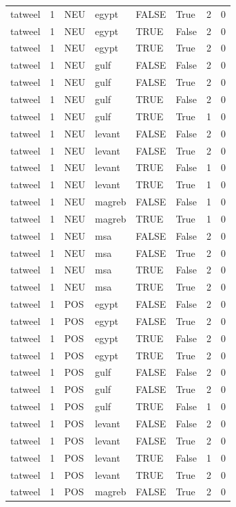 \begin{tabular}{llllllrr}
tatweel & 1 & NEU & egypt & FALSE & True & 2 & 0 \\
tatweel & 1 & NEU & egypt & TRUE & False & 2 & 0 \\
tatweel & 1 & NEU & egypt & TRUE & True & 2 & 0 \\
tatweel & 1 & NEU & gulf & FALSE & False & 2 & 0 \\
tatweel & 1 & NEU & gulf & FALSE & True & 2 & 0 \\
tatweel & 1 & NEU & gulf & TRUE & False & 2 & 0 \\
tatweel & 1 & NEU & gulf & TRUE & True & 1 & 0 \\
tatweel & 1 & NEU & levant & FALSE & False & 2 & 0 \\
tatweel & 1 & NEU & levant & FALSE & True & 2 & 0 \\
tatweel & 1 & NEU & levant & TRUE & False & 1 & 0 \\
tatweel & 1 & NEU & levant & TRUE & True & 1 & 0 \\
tatweel & 1 & NEU & magreb & FALSE & False & 1 & 0 \\
tatweel & 1 & NEU & magreb & TRUE & True & 1 & 0 \\
tatweel & 1 & NEU & msa & FALSE & False & 2 & 0 \\
tatweel & 1 & NEU & msa & FALSE & True & 2 & 0 \\
tatweel & 1 & NEU & msa & TRUE & False & 2 & 0 \\
tatweel & 1 & NEU & msa & TRUE & True & 2 & 0 \\
tatweel & 1 & POS & egypt & FALSE & False & 2 & 0 \\
tatweel & 1 & POS & egypt & FALSE & True & 2 & 0 \\
tatweel & 1 & POS & egypt & TRUE & False & 2 & 0 \\
tatweel & 1 & POS & egypt & TRUE & True & 2 & 0 \\
tatweel & 1 & POS & gulf & FALSE & False & 2 & 0 \\
tatweel & 1 & POS & gulf & FALSE & True & 2 & 0 \\
tatweel & 1 & POS & gulf & TRUE & False & 1 & 0 \\
tatweel & 1 & POS & levant & FALSE & False & 2 & 0 \\
tatweel & 1 & POS & levant & FALSE & True & 2 & 0 \\
tatweel & 1 & POS & levant & TRUE & False & 1 & 0 \\
tatweel & 1 & POS & levant & TRUE & True & 2 & 0 \\
tatweel & 1 & POS & magreb & FALSE & True & 2 & 0 \\

\end{tabular}
